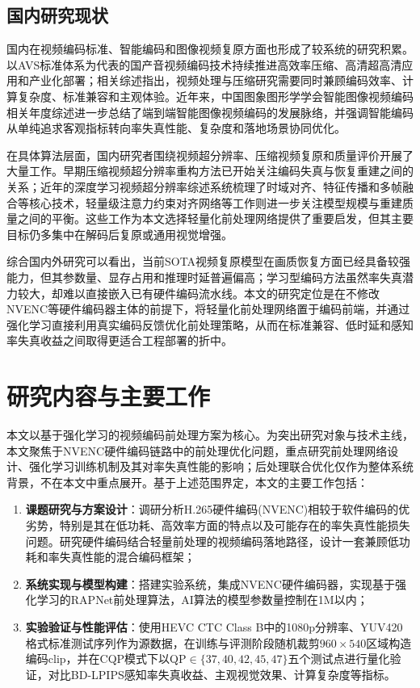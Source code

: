 \subsection{国内研究现状}

国内在视频编码标准、智能编码和图像视频复原方面也形成了较系统的研究积累。以AVS标准体系为代表的国产音视频编码技术持续推进高效率压缩、高清超高清应用和产业化部署；相关综述指出，视频处理与压缩研究需要同时兼顾编码效率、计算复杂度、标准兼容和主观体验\cite{ref65-jia2021video}。近年来，中国图象图形学学会智能图像视频编码相关年度综述进一步总结了端到端智能图像视频编码的发展脉络，并强调智能编码从单纯追求客观指标转向率失真性能、复杂度和落地场景协同优化\cite{ref29-tong2025annual}。

在具体算法层面，国内研究者围绕视频超分辨率、压缩视频复原和质量评价开展了大量工作。早期压缩视频超分辨率重构方法已开始关注编码失真与恢复重建之间的关系\cite{ref69-zhou2006compressedvsr}；近年的深度学习视频超分辨率综述系统梳理了时域对齐、特征传播和多帧融合等核心技术\cite{ref66-jiang2023vsr}，轻量级注意力约束对齐网络等工作则进一步关注模型规模与重建质量之间的平衡\cite{ref67-jin2022lightvsr}。这些工作为本文选择轻量化前处理网络提供了重要启发，但其主要目标仍多集中在解码后复原或通用视觉增强。

综合国内外研究可以看出，当前SOTA视频复原模型在画质恢复方面已经具备较强能力，但其参数量、显存占用和推理时延普遍偏高；学习型编码方法虽然率失真潜力较大，却难以直接嵌入已有硬件编码流水线。本文的研究定位是在不修改NVENC等硬件编码器主体的前提下，将轻量化前处理网络置于编码前端，并通过强化学习直接利用真实编码反馈优化前处理策略，从而在标准兼容、低时延和感知率失真收益之间取得更适合工程部署的折中。

\section{研究内容与主要工作}

本文以基于强化学习的视频编码前处理方案为核心。为突出研究对象与技术主线，本文聚焦于NVENC硬件编码链路中的前处理优化问题，重点研究前处理网络设计、强化学习训练机制及其对率失真性能的影响；后处理联合优化仅作为整体系统背景，不在本文中重点展开。基于上述范围界定，本文的主要工作包括：

\begin{enumerate}
  \item \textbf{课题研究与方案设计}：调研分析H.265硬件编码(NVENC)相较于软件编码的优劣势，特别是其在低功耗、高效率方面的特点以及可能存在的率失真性能损失问题。研究硬件编码结合轻量前处理的视频编码落地路径，设计一套兼顾低功耗和率失真性能的混合编码框架；
  \item \textbf{系统实现与模型构建}：搭建实验系统，集成NVENC硬件编码器，实现基于强化学习的RAPNet\cite{ref27-zhao2025rapnet}前处理算法，AI算法的模型参数量控制在1M以内；
  \item \textbf{实验验证与性能评估}：使用HEVC CTC Class B中的1080p分辨率、YUV420格式标准测试序列\cite{ref-bossen2013ctc}作为源数据，在训练与评测阶段随机裁剪$960\times540$区域构造编码clip，并在CQP模式下以QP$\in\{37,40,42,45,47\}$五个测试点进行量化验证，对比BD-LPIPS感知率失真收益、主观视觉效果、计算复杂度等指标。
\end{enumerate}

